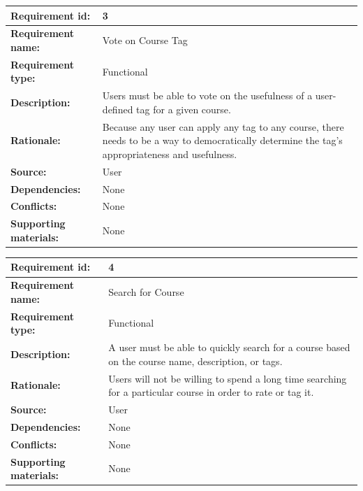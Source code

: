 \documentclass[12pt]{report}
\begin{document}
\begin{tabular}{|l|p{7.5cm}|}
\hline
\textbf{Requirement id:}	& 3 \\
\hline
\textbf{Requirement name:}	&  Vote on Course Tag \\
\hline
\textbf{Requirement type:}	& Functional \\
\hline
\textbf{Description:}	&  Users must be able to vote on the usefulness of a user-defined tag for a given course. \\
\hline
\textbf{Rationale:}	&  Because any user can apply any tag to any course, there needs to be a way to democratically determine the tag's appropriateness and usefulness. \\
\hline
\textbf{Source:}	& User \\
\hline
\textbf{Dependencies:}	& None \\
\hline
\textbf{Conflicts:}	& None \\
\hline
\textbf{Supporting materials:}	& None \\
\hline
\end{tabular}

\bigskip

\begin{tabular}{|l|p{7.5cm}|}
\hline
\textbf{Requirement id:}	& 4 \\
\hline
\textbf{Requirement name:}	&  Search for Course \\
\hline
\textbf{Requirement type:}	& Functional \\
\hline
\textbf{Description:}	&  A user must be able to quickly search for a course based on the course name, description, or tags. \\
\hline
\textbf{Rationale:}	&  Users will not be willing to spend a long time searching for a particular course in order to rate or tag it. \\
\hline
\textbf{Source:}	& User \\
\hline
\textbf{Dependencies:}	& None \\
\hline
\textbf{Conflicts:}	& None \\
\hline
\textbf{Supporting materials:}	& None \\
\hline
\end{tabular}

\bigskip
\end{document}
